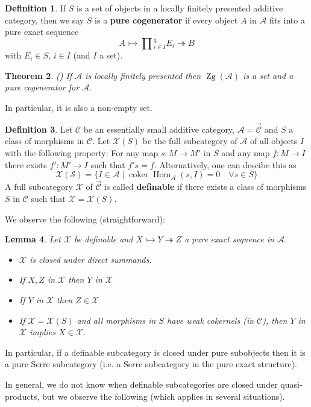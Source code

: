 \documentclass[11pt,a4paper]{amsart}
\theoremstyle{plain}
\newtheorem{thm}{Theorem}[section]
\newtheorem{lem}[thm]{Lemma}
\theoremstyle{definition}
\newtheorem{dfn}[thm]{Definition}
\DeclareMathOperator{\Hom}{Hom}
\DeclareMathOperator{\coKer}{coker}
\newcommand{\defl}{\twoheadrightarrow}
\newcommand{\infl}{\rightarrowtail}
\newcommand{\mcA}{\mathcal{A}}
\newcommand{\mcC}{\mathcal{C}}
\newcommand{\mcS}{\mathcal{S}}
\newcommand{\mcX}{\mathcal{X}}
\DeclareMathOperator{\Zg}{Zg}
\begin{document}
\begin{dfn}
If $S$ is a set of objects in a locally finitely presented additive category, then we say $S$ is a \textbf{pure cogenerator} if every object $A$ in $\mcA$ fits into a pure exact sequence
\[
A\infl \prod{}^q_{i\in I} E_i \defl B
\]
with $E_i\in S$, $i \in I$ (and $I$ a set). 
\end{dfn}

\begin{thm} (\cite[Cor 4]{BeG})
If $\mcA$ is locally finitely presented then 
$\Zg (\mcA )$ is a set and a pure cogenerator for $\mcA$.     
\end{thm}
In particular, it is also a non-empty set. 


\begin{dfn}
Let $\mcC$ be an essentially small additive category, $\mcA=\overrightarrow{\mcC}$ and $S$ a class of morphisms in $\mcC$. 
Let $\mcX(S)$ be the full subcategory of $\mcA$ of all objects $I$ with the following property: For any map $s\colon M \to M'$
in $S$ and any map $f \colon M \to I$ there exists $f'\colon M'\to I$ such that $f's=f$. Alternatively, one can descibe this as 
\[
\mcX (\mcS) =\{I\in \mcA\mid \coKer \Hom_{\mcA} (s, I)=0 \quad \forall s\in S\}
\]
A full subcategory $\mcX$ of $\overrightarrow{\mcC}$
is called \textbf{definable} if there exists a class of morphisms $S$ in $\mcC$ such that $\mcX=\mcX(S)$. 
\end{dfn}

We observe the following (straightforward):
\begin{lem} \label{firstProperties}
Let $\mcX$ be definable and $X\infl Y \defl Z$ a pure exact sequence in $\mcA$. \\
\begin{itemize}
\item[(0)] $\mcX$ is closed under direct summands. 
\item[(1)] If $X,Z$ in $\mcX$ then $Y$ in $\mcX$
\item[(2)] If $Y$ in $\mcX$ then $Z\in \mcX$
\item[(3)] If $\mcX=\mcX(S)$ and all morphisms in $S$ have weak cokernels (in $\mcC$), then $Y$ in $\mcX$ implies $X \in \mcX$. 
\end{itemize}
\end{lem}

In particular, if a definable subcategory is closed under pure subobjects then it is a pure Serre subcategory (i.e. a Serre subcategory in the pure exact structure). 

In general, we do not know when definable subcategories are closed under quasi-products, but we observe the following (which applies in several situations). 
\end{document}
